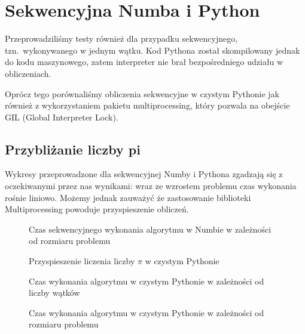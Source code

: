 \section{Sekwencyjna Numba i Python}
Przeprowadziliśmy testy również dla przypadku sekwencyjnego, tzn.\ wykonywanego w jednym wątku.
Kod Pythona został skompilowany jednak do kodu maszynowego, zatem interpreter nie brał bezpośredniego udziału w obliczeniach.

Oprócz tego porównaliśmy obliczenia sekwencyjne w czystym Pythonie jak również z wykorzystaniem pakietu multiprocessing,
który pozwala na obejście GIL (Global Interpreter Lock).

\subsection{Przybliżanie liczby pi}
Wykresy przeprowadzone dla sekwencyjnej Numby i Pythona zgadzają się z oczekiwanymi przez nas wynikami: wraz ze wzrostem problemu czas wykonania rośnie liniowo.
Możemy jednak zauważyć że zastosowanie biblioteki Multiprocessing powoduje przyspieszenie obliczeń.

\begin{figure*}
    \centering
    
    \caption{Czas sekwencyjnego wykonania algorytmu w Numbie w zależności od rozmiaru problemu}
    \label{fig:numba-seq-sizes}
\end{figure*}

\begin{figure*}
    \centering
    \begin{minipage}[b]{.45\textwidth}
        \centering
        
        \caption{Przyspieszenie liczenia liczby $\pi$ w czystym Pythonie}
        \label{fig:python-speedup}
    \end{minipage}
    \hfill
    \begin{minipage}[b]{.45\textwidth}
        \centering
        
        \caption{Czas wykonania algorytmu w czystym Pythonie w zależności od liczby wątków}
        \label{fig:python-threads}
    \end{minipage}
\end{figure*}

\begin{figure*}
    \centering
    
    \caption{Czas wykonania algorytmu w czystym Pythonie w zależności od rozmiaru problemu}
    \label{fig:python-sizes}
\end{figure*}
